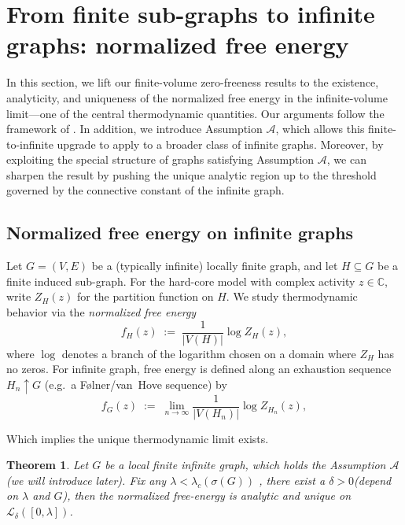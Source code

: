 \documentclass[a4paper,11pt]{article}
\theoremstyle{plain}
\newtheorem{theorem}{Theorem}[section]
\theoremstyle{definition}
\theoremstyle{remark}
\newcommand{\1}{\mathbf{1}}
\begin{document}
    
\appendix

\section{From finite sub-graphs to infinite graphs: normalized free energy}
\label{sec:infinite_lattice_free_energy}

In this section, we lift our finite-volume zero-freeness results to the existence, analyticity, and uniqueness of the normalized free energy in the infinite-volume limit—one of the central thermodynamic quantities. Our arguments follow the framework of \cite{scott2005repulsive}. In addition, we introduce Assumption $\mathcal{A}$, which allows this finite-to-infinite upgrade to apply to a broader class of infinite graphs. Moreover, by exploiting the special structure of graphs satisfying Assumption $\mathcal{A}$, we can sharpen the result by pushing the unique analytic region up to the threshold governed by the connective constant of the infinite graph.

\subsection{Normalized free energy on infinite graphs}
Let $G=(V,E)$ be a (typically infinite) locally finite graph, and let $H\subseteq G$ be a finite induced sub-graph.
For the hard-core model with complex activity $z\in\mathbb{C}$, write $Z_H(z)$ for the partition function on $H$.
We study thermodynamic behavior via the \emph{normalized free energy}
\begin{equation}
  f_H(z)\;:=\;\frac{1}{|V(H)|}\log Z_H(z),
\end{equation}
where $\log$ denotes a branch of the logarithm chosen on a domain where $Z_H$ has no zeros. For infinite graph, free energy is defined along an exhaustion sequence $H_n\uparrow G$ (e.g.\ a F\o lner/van~Hove sequence) by
\begin{equation}
  f_G(z)\;:=\;\lim_{n\to\infty}\frac{1}{|V(H_n)|}\log Z_{H_n}(z),
\end{equation}

Which implies the unique thermodynamic limit exists. 

\begin{theorem}
    Let $G$ be a local finite infinite graph, which holds the Assumption $\mathcal{A}$(we will introduce later). Fix any $\lambda<\lambda_c(\sigma(G))$ , there exist a $\delta>0$(depend on $\lambda$ and $G$), then the normalized free-energy is analytic and unique on $\mathcal{L}_{\delta}([0, \lambda])$.
    \label{thm:infinite_threshold_strong}
\end{theorem}
\end{document}

